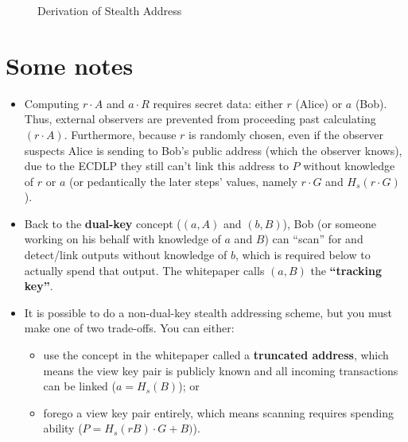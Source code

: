\documentclass[a4paper,10pt]{article}
\begin{document}
\begin{figure}[!htbp]
	\caption{Derivation of Stealth Address}\label{fig-stealth-address-gen}
\end{figure}
\section{Some notes}
	\begin{itemize}
		\item Computing \(r\cdot A\) and \(a\cdot R\) requires secret data: either \(r\) (Alice) or \(a\) (Bob). Thus, external observers are prevented from proceeding past calculating \( (r\cdot A)\). Furthermore, because \(r\) is randomly chosen, even if the observer suspects Alice is sending to Bob's public address (which the observer knows), due to the ECDLP they still can't link this address to \(P\) without knowledge of \(r\) or \(a\) (or pedantically the later steps' values, namely \(r\cdot G\) and \(H_s(r\cdot G)\)).
		\item Back to the \textbf{dual-key} concept (\( (a,A)\) and \( (b,B)\)), Bob (or someone working on his behalf with knowledge of \(a\) and \(B\)) can ``scan'' for and detect/link outputs without knowledge of \(b\), which is required below to actually spend that output. The whitepaper calls \((a,B)\) the \textbf{``tracking key''}.
		\item It is possible to do a non-dual-key stealth addressing scheme, but you must make one of two trade-offs. You can either: 
			\begin{itemize}
				\item use the concept in the whitepaper called a \textbf{truncated address}, which means the view key pair is publicly known and all incoming transactions can be linked (\(a = H_s(B)\)); or 
				\item forego a view key pair entirely, which means scanning requires spending ability (\(P = H_s(rB)\cdot G + B)\)).
			\end{itemize}
	\end{itemize}

\printbibliography
\end{document}
